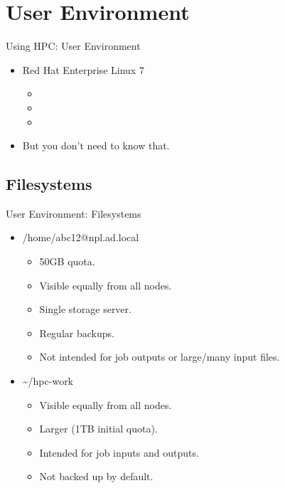 



\section{User Environment}
\begin{frame}{Using HPC: User Environment}
\begin{itemize}
\item<1,3->{\alert<1>{{Red Hat Enterprise Linux 7}}}
\begin{itemize}
\item{}
\item{}
\item{}
\end{itemize}
\item<2->{But you don't need to know that.}
\end{itemize}
\end{frame}

\subsection{Filesystems}
\begin{frame}{User Environment: Filesystems}
\begin{itemize}
\item{\alert{/home/abc12@npl.ad.local}}
\begin{itemize}
\item{50GB quota.}
\item{Visible equally from all nodes.}
\item{Single storage server.}
\item{Regular backups.}
\item{Not intended for job outputs or large/many input files.}
\end{itemize}
\item{\alert{\~{}/hpc-work}}
\begin{itemize}
\item{Visible equally from all nodes.}
\item{Larger (1TB initial quota).}
\item{Intended for job inputs and outputs.}
\item{{\color{red}Not backed up by default.}}
\end{itemize}
\end{itemize}
\end{frame}

